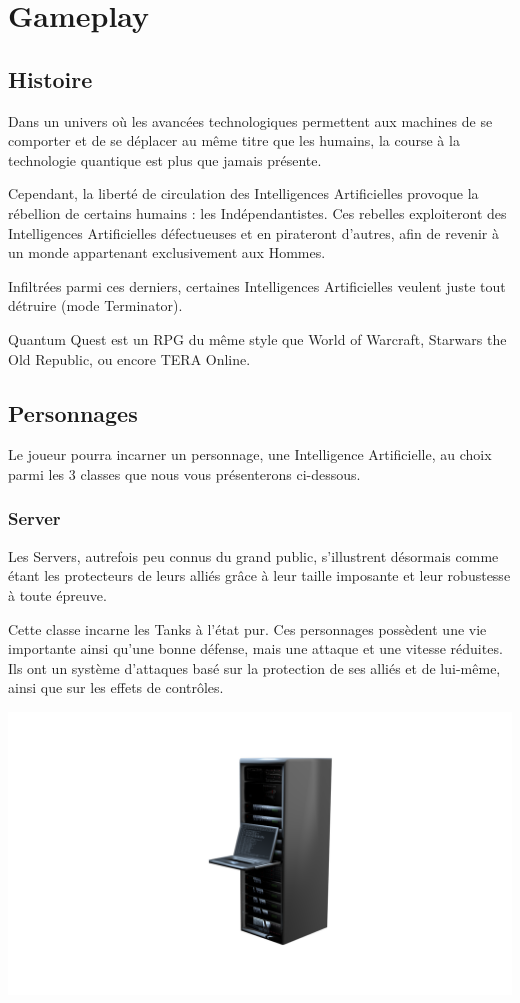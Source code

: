 \documentclass[A4paper,11pt]{article}
\begin{document}
\section{Gameplay}
\subsection{Histoire}
Dans un univers o\`u les avanc\'ees technologiques permettent aux machines de se comporter et de se d\'eplacer au m\^eme titre que les humains, la course \`a la technologie quantique est plus que jamais pr\'esente. 

Cependant, la libert\'e de circulation des Intelligences Artificielles provoque la r\'ebellion de certains humains : les Ind\'ependantistes. Ces rebelles exploiteront des Intelligences Artificielles d\'efectueuses et en pirateront d'autres, afin de revenir \`a un monde appartenant exclusivement aux Hommes. 

Infiltr\'ees parmi ces derniers, certaines Intelligences Artificielles veulent juste tout d\'etruire (mode Terminator).

Quantum Quest est un RPG du m\^eme style que World of Warcraft, Starwars the Old Republic, ou encore TERA Online.
\newpage
\subsection{Personnages}
Le joueur pourra incarner un personnage, une Intelligence Artificielle, au choix parmi les 3 classes que nous vous pr\'esenterons ci-dessous.
\subsubsection{Server}
Les Servers, autrefois peu connus du grand public, s'illustrent d\'esormais comme \'etant les protecteurs de leurs alli\'es gr\^ace \`a leur taille imposante et leur robustesse \`a toute \'epreuve.

Cette classe incarne les Tanks \`a l'\'etat pur. Ces personnages poss\`edent une vie importante ainsi qu'une bonne d\'efense, mais une attaque et une vitesse r\'eduites. Ils ont un syst\`eme d'attaques bas\'e sur la protection de ses alli\'es et de lui-m\^eme, ainsi que sur les effets de contr\^oles.
\begin{center}
\includegraphics[scale=0.25]{sever.png}
\end{center}
\end{document}
